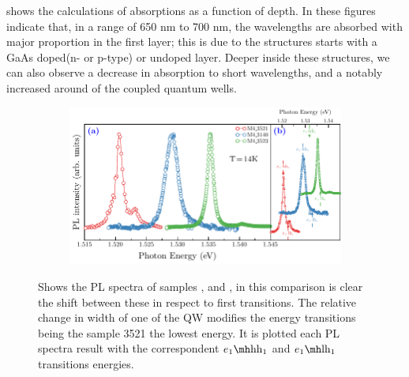 shows the calculations of absorptions as a function of depth. In these figures indicate that,  in a range of 650 nm to 700 nm, the wavelengths are absorbed with major proportion in the first layer;  this is due to the structures starts with a GaAs doped(n- or p-type) or undoped layer. Deeper inside these structures, we can also observe a
decrease in absorption to short wavelengths, and a notably increased around of the coupled quantum wells.
\begin{figure}[hbtp!]
	\centering
	\begin{subfigure}{\textwidth}
		\includegraphics[width=\textwidth]{../figures/chapter-3/pl-plots/build-ruco/pl-2}
		\label{subfig:chapter-3-PL-experiments-M4_3140-M4_3521-M4_3523-a)}
		\label{subfig:chapter-3-PL-experiments-M4_3140-M4_3521-M4_3523-b)}
	\end{subfigure}
	\caption{ Shows the PL spectra of samples ,  and , in this comparison is clear the shift  between these in respect to first transitions. The relative change in width of one of the QW modifies the  energy transitions being the sample 3521 the lowest energy.  It is plotted  each PL spectra result with the correspondent $\thh{1}{1}$ and $\tlh{1}{1}$ transitions energies. }
	\label{fig:chapter-3-PL-experiments-M4_3140-M4_3521-M4_3523}
\end{figure}

